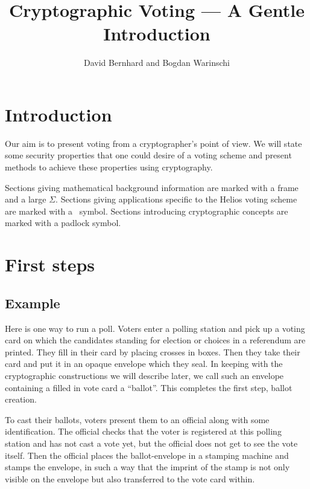 \documentclass[envcountsame]{llncs}
\title{Cryptographic Voting --- A Gentle Introduction}
\author{David Bernhard and Bogdan Warinschi}
\institute{University of Bristol, England}
\begin{document}
\maketitle

\let\oldclearpage\clearpage
\let\clearpage\relax
\setcounter{tocdepth}{2}
\vfil
\tableofcontents
\let\clearpage\oldclearpage
\clearpage

\section{Introduction}

Our aim is to present voting from a cryptographer's point of view. We will state
some security properties that one could desire of a voting scheme and present
methods to achieve these properties using cryptography.

Sections giving mathematical background information are marked with a frame and
a large $\Sigma$. Sections giving applications specific to the Helios voting
scheme are marked with a \Sun\ symbol. Sections introducing cryptographic
concepts are marked with a padlock symbol.

\section{First steps}

\subsection{Example}

Here is one way to run a poll. Voters enter a polling station and pick up a voting card on which the candidates standing for election or choices in a referendum are printed. They fill in their card by placing crosses in boxes. Then they take their card and put it in an opaque envelope which they seal. In keeping with the cryptographic constructions we will describe later, we call such an envelope containing a filled in vote card a ``ballot''. This completes the first step, ballot creation.

To cast their ballots, voters present them to an official along with some identification. The official checks that the voter is registered at this polling station and has not cast a vote yet, but the official does not get to see the vote itself. Then the official places the ballot-envelope in a stamping machine and stamps the envelope, in such a way that the imprint of the stamp is not only visible on the envelope but also transferred to the vote card within.
\end{document}
